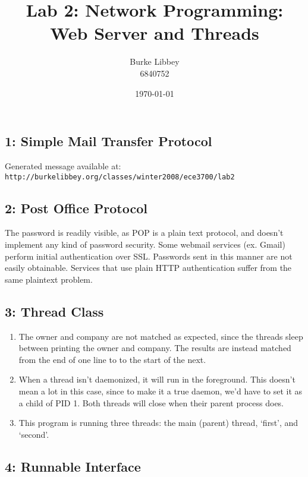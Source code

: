 \documentclass[10pt,letterpaper,titlepage]{article}
\begin{document}
\author{Burke Libbey \\ 6840752}
\title{Lab 2: Network Programming: Web Server and Threads}
\date{\today}

\maketitle

\subsection*{1: Simple Mail Transfer Protocol}

Generated message available at: \\
\texttt{http://burkelibbey.org/classes/winter2008/ece3700/lab2}

\subsection*{2: Post Office Protocol}

The password is readily visible, as POP is a plain text protocol, and doesn't implement any kind of password security. Some webmail services (ex. Gmail) perform initial authentication over SSL. Passwords sent in this manner are not easily obtainable. Services that use plain HTTP authentication suffer from the same plaintext problem.

\subsection*{3: Thread Class}

\begin{enumerate}
  \item The owner and company are not matched as expected, since the threads sleep between printing the owner and company. The results are instead matched from the end of one line to to the start of the next.
  \item When a thread isn't daemonized, it will run in the foreground. This doesn't mean a lot in this case, since to make it a true daemon, we'd have to set it as a child of PID 1. Both threads will close when their parent process does.

  \item This program is running three threads: the main (parent) thread, `first', and `second'.

\end{enumerate}

\subsection*{4: Runnable Interface}
\end{document}
